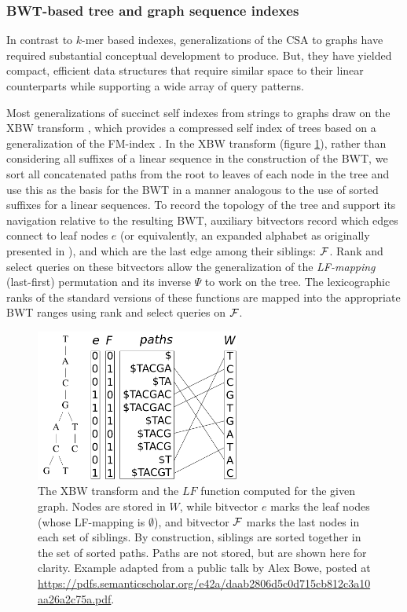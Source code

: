 \subsubsection{BWT-based tree and graph sequence indexes}

In contrast to $k$-mer based indexes, generalizations of the CSA to graphs have required substantial conceptual development to produce.
But, they have yielded compact, efficient data structures that require similar space to their linear counterparts while supporting a wide array of query patterns.

Most generalizations of succinct self indexes from strings to graphs draw on the XBW transform \cite{ferragina2005structuring}, which provides a compressed self index of trees based on a generalization of the FM-index \cite{ferragina2009compressing}.
In the XBW transform (figure \ref{fig:xbw}), rather than considering all suffixes of a linear sequence in the construction of the BWT, we sort all concatenated paths from the root to leaves of each node in the tree and use this as the basis for the BWT in a manner analogous to the use of sorted suffixes for a linear sequences.
To record the topology of the tree and support its navigation relative to the resulting BWT, auxiliary bitvectors record which edges connect to leaf nodes $e$ (or equivalently, an expanded alphabet as originally presented in \cite{ferragina2005structuring}), and which are the last edge among their siblings: ${\cal F}$.
Rank and select queries on these bitvectors allow the generalization of the \emph{LF-mapping} (last-first) permutation and its inverse $\Psi$ to work on the tree.
The lexicographic ranks of the standard versions of these functions are mapped into the appropriate BWT ranges using rank and select queries on ${\cal F}$.


\begin{figure}[htbp!]
  \centering
  \includegraphics[width=0.6\textwidth]{Chapter2/Figs/xbw_viz.pdf}
  \caption[The XBW transform]{
    The XBW transform and the $LF$ function computed for the given graph.
    Nodes are stored in $W$, while bitvector $e$ marks the leaf nodes (whose LF-mapping is $\emptyset$), and bitvector ${\cal F}$ marks the last nodes in each set of siblings.
    By construction, siblings are sorted together in the set of sorted paths.
    Paths are not stored, but are shown here for clarity.
    Example adapted from a public talk by Alex Bowe, posted at \url{https://pdfs.semanticscholar.org/e42a/daab2806d5c0d715cb812c3a10aa26a2c75a.pdf}.
  }
  \label{fig:xbw}
\end{figure}



